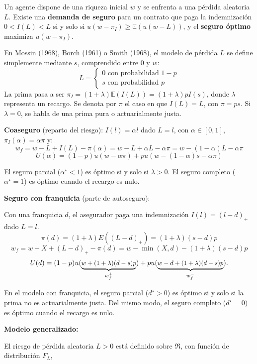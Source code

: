 \begin{f}
	
	Un agente dispone de una riqueza inicial \(w\) y se enfrenta a una pérdida aleatoria \(L\). Existe una \textbf{demanda de seguro} para un contrato que paga la indemnización \(0<I(L)<L\) si y solo si \(u(w-\pi_I) \geq \mathbb{E}(u(w-L))\), y el \textbf{seguro óptimo} maximiza \(u(w-\pi_I)\).
	
	En Mossin (1968), Borch (1961) o Smith (1968), el modelo de pérdida \(L\) se define simplemente mediante \(s\), comprendido entre 0 y \(w\):
	\[
	L=\left\{\begin{array}{l}
		0 \text { con probabilidad } 1-p \\
		s \text { con probabilidad } p
	\end{array}\right.
	\]
	La prima pasa a ser \(\pi_I=(1+\lambda) \mathbb{E}(I(L))=(1+\lambda) p I(s)\), donde \(\lambda\) representa un recargo. Se denota por \(\pi\) el caso en que \(I(L)=L\), con \(\pi= p s\). Si \(\lambda=0\), se habla de una prima pura o actuarialmente justa.
	\medskip
	
	\textbf{Coaseguro} (reparto del riesgo):
	\(I(l)=\alpha l\) dado \(L=l\), con \(\alpha \in[0,1]\), \(\pi_I(\alpha)=\alpha \pi\) y:
	\[
	w_{f}=w-L+I(L)-\pi(\alpha)=w-L+\alpha L-\alpha \pi=w-(1-\alpha) L-\alpha \pi
	\]
	\[
	U(\alpha)
	=(1-p) u(w-\alpha \pi)+p u(w-(1-\alpha) s-\alpha \pi)
	\]
	
	El seguro parcial (\(\alpha^{\star}<1\)) es óptimo si y solo si \(\lambda>0\). El seguro completo (\(\alpha^{\star}=1\)) es óptimo cuando el recargo es nulo.
	\medskip
	
	\textbf{Seguro con franquicia} (parte de autoseguro):
	
	Con una franquicia \(d\), el asegurador paga una indemnización \(I(l)=(l-d)_{+}\) dado \(L=l\).
	\[
	\pi(d)=(1+\lambda) E\left((L-d)_{+}\right)=(1+\lambda)(s-d) p
	\]
	\[
	w_{f}=w-X+(L-d)_{+}-\pi(d)=w-\min (X, d)-(1+\lambda)(s-d) p
	\]
	\[\small
	U(d)=(1-p) u(\underbrace{w+(1+\lambda)(d-s) p}_{w_{f}^{+}})+p u(\underbrace{w-d+(1+\lambda)(d-s) p}_{w_{f}^{-}}) .
	\]
	
	En el modelo con franquicia, el seguro parcial (\(d^{\star}>0\)) es óptimo si y solo si la prima no es actuarialmente justa. Del mismo modo, el seguro completo (\(d^{\star}=0\)) es óptimo cuando el recargo es nulo.
	\medskip
	
	\textbf{Modelo generalizado:}
	
	El riesgo de pérdida aleatoria \(L>0\) está definido sobre \(\Re\), con función de distribución \(F_L\),
	

\end{f}
